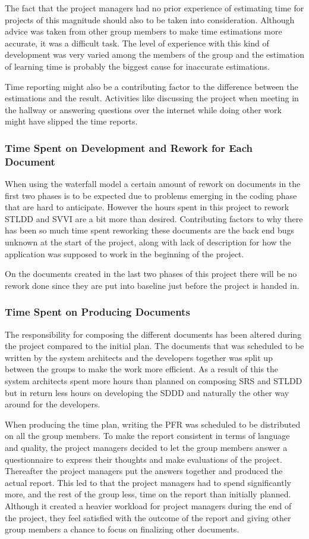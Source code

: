 \documentclass[a4paper]{article}
\begin{document}
The fact that the project managers had no prior experience of estimating time for projects of this magnitude should also to be taken into consideration. Although advice was taken from other group members to make time estimations more accurate, it was a difficult task. The level of experience with this kind of development was very varied among the members of the group and the estimation of learning time is probably the biggest cause for inaccurate estimations.

Time reporting might also be a contributing factor to the difference between the estimations and the result. Activities like discussing the project when meeting in the hallway or answering questions over the internet while doing other work might have slipped the time reports. 


\subsubsection{Time Spent on Development and Rework for Each Document} 
When using the waterfall model a certain amount of rework on documents in the first two phases is to be expected due to problems emerging in the coding phase that are hard to anticipate. However the hours spent in this project to rework STLDD and  SVVI are a bit more than desired. Contributing factors to why there has been so much time spent reworking these documents are the back end bugs unknown at the start of the project, along with lack of description for how the application was supposed to work in the beginning of the project.

On the documents created in the last two phases of this project there will be no rework done since they are put into baseline just before the project is handed in. 


\subsubsection{Time Spent on Producing Documents}
The responsibility for composing the different documents has been altered during the project compared to the initial plan. The documents that was scheduled to be written by the system architects and the developers together was split up between the groups to make the work more efficient. As a result of this the system architects spent more hours than planned on composing SRS and STLDD but in return less hours on developing the SDDD and naturally the other way around for the developers. 

When producing the time plan, writing the PFR was scheduled to be distributed on all the group members. To make the report consistent in terms of language and quality, the project managers decided to let the group members answer a questionnaire to express their thoughts  and make evaluations of the project. Thereafter the project managers put the answers together and produced the actual report. This led to that the project managers had to spend significantly more, and the rest of the group less, time on the report than initially planned. Although it created a heavier workload for project managers during the end of the project, they feel satisfied with the outcome of the report and giving other group members a chance to focus on finalizing other documents.
\end{document}
